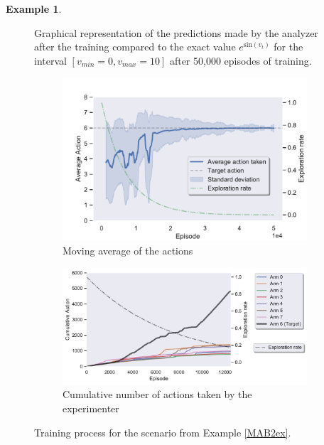 \documentclass[11pt,a4paper,twoside]{report}
\newcommand{\+}{\textnormal{+} }
\theoremstyle{definition}
\newtheorem{myex}[mythm]{Example}
\numberwithin{equation}{chapter}
\begin{document}
\begin{myex}
\begin{figure}
      \caption{Graphical representation of the predictions made by the analyzer
      after the training compared to the exact value $e^{\text{sin}(v_t)}$ for 
      the interval $[v_{min}=0,v_{max}=10]$ after 50,000 episodes of training.}
      \label{performanceMBA2}
    \end{figure}


    \begin{figure}[]
      \centering
      \begin{subfigure}{.5\textwidth}
        \centering
        \includegraphics[width=1\linewidth]{figures/Actions-MAB2.pdf}
        \caption{Moving average of the actions}
        \label{fig:ActionAverageMAB2}
      \end{subfigure}%
      \begin{subfigure}{.5\textwidth}
        \centering
        \includegraphics[width=1\linewidth]{figures/Cum-action-MAB2.pdf}
        \caption{Cumulative number of actions taken by the experimenter}
        \label{fig:actionsMAB2}
      \end{subfigure}
      \caption{Training process for the scenario from Example \ref{MAB2ex}.
}
\end{figure}
\end{myex}
\end{document}
